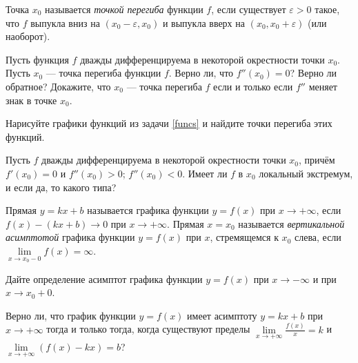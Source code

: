 \documentclass[a4paper,12pt]{article}
\begin{document}
 Точка $x_0$ называется {\it точкой перегиба} функции $f$, если
существует $\varepsilon>0$ такое, что $f$ выпукла вниз
на $(x_0-\varepsilon,x_0)$ и выпукла вверх на $(x_0,x_0+\varepsilon)$
(или наоборот).

 Пусть функция $f$ дважды дифференцируема в некоторой окрестности
точки $x_0$.
Пусть $x_0$ --- точка перегиба функции $f$.
Верно ли, что $f''(x_0)=0$? Верно ли обратное? %
Докажите, что $x_0$ --- точка перегиба $f$ если и только если
$f''$ меняет знак в точке $x_0$.

Нарисуйте графики функций из задачи \ref{funcs}
и найдите точки перегиба этих функций.

Пусть $f$ дважды дифференцируема в некоторой окрестности точки $x_0$,
причём $f'(x_0)=0$ и
$f''(x_0)>0$;
$f''(x_0)<0$.
Имеет ли $f$ в $x_0$ локальный экстремум, и если да, то какого типа?



 Прямая $y=kx+b$ называется %
графика функции $y=f(x)$ при $x\to+\infty$,
если %
$f(x)-(kx+b)\to0$ при $x\to+\infty$.
Прямая $x=x_0$ называется {\it вертикальной асимптотой\/}
графика функции $y=f(x)$ при $x$, стремящемся к $x_{0}$ слева,
если $\lim\limits_{x\rightarrow x_{0}-0}f(x)=\infty$.

Дайте определение асимптот графика функции $y=f(x)$
при $x\to-\infty$ и при $x\rightarrow x_{0}+0$.

Верно ли, что график функции $y=f(x)$ имеет асимптоту
$y=kx+b$ при $x\to+\infty$ тогда и только тогда, когда
существуют пределы
$\lim\limits_{x\to+\infty}\displaystyle\frac{f(x)}{x}=k$
и $\lim\limits_{x\to+\infty}(f(x)-kx)=b$?

\end{document}
